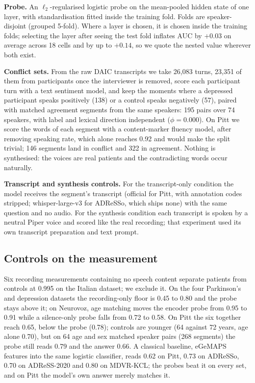 \documentclass{article}
\begin{document}
\noindent\textbf{Probe.} An $\ell_2$-regularised logistic probe on the mean-pooled hidden state of
one layer, with standardisation fitted inside the training fold. Folds are speaker-disjoint
(grouped 5-fold). Where a layer is chosen, it is chosen inside the training folds; selecting the
layer after seeing the test fold inflates AUC by $+0.03$ on average across 18 cells and by up to
$+0.14$, so we quote the nested value wherever both exist.

\noindent\textbf{Conflict sets.} From the raw DAIC transcripts we take 26{,}083 turns, 23{,}351 of
them from participants once the interviewer is removed, score each participant turn with a text
sentiment model, and keep the moments where a depressed participant speaks
positively (138) or a control speaks negatively (57), paired with matched agreement segments from
the same speakers: 195 pairs over 74 speakers, with label and lexical direction independent
($\phi = 0.000$). On Pitt we score the words of each segment with a content-marker fluency model,
after removing speaking rate, which alone reaches 0.92 and would make the split trivial; 146
segments land in conflict and 322 in agreement. Nothing is synthesised: the voices are real
patients and the contradicting words occur naturally.

\noindent\textbf{Transcript and synthesis controls.} For the transcript-only condition the model
receives the segment's transcript (official for Pitt, with annotation codes stripped; whisper-large-v3
\cite{whisper} for ADReSSo, which ships none) with the same question and no audio. For the synthesis condition each transcript is spoken by a neutral
Piper voice \cite{piper} and scored like the real recording; that experiment used its own transcript
preparation and text prompt.

\subsection{Controls on the measurement}\label{sec:controls}

Six recording
measurements containing no speech content separate patients from controls at 0.995 on the Italian
dataset; we exclude it. On the four Parkinson's and depression datasets the recording-only
floor is 0.45 to 0.80 and the probe stays above it; on Neurovoz, age matching moves the encoder
probe from 0.95 to 0.91 while a silence-only probe falls from 0.72 to 0.58. On Pitt the six together
reach 0.65, below the probe (0.78); controls are younger (64 against 72 years, age alone 0.70), but on
64 age and sex matched speaker pairs (268 segments) the probe still reads 0.79 and the answer 0.66. A
classical baseline, eGeMAPS features \cite{egemaps} into the same logistic classifier, reads
0.62 on Pitt, 0.73 on ADReSSo, 0.70 on ADReSS-2020 and 0.80 on MDVR-KCL; the probes beat it on every
set, and on Pitt the model's own answer merely matches it.
\end{document}
